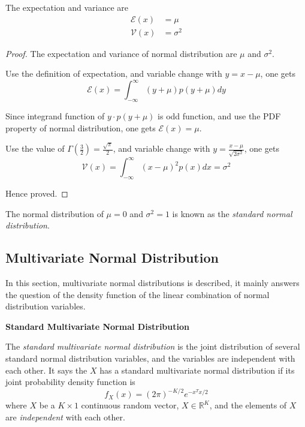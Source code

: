 The expectation and variance are
\begin{align*}
    \mathcal{E}(x) & = \mu      \\
    \mathcal{V}(x) & = \sigma^2
\end{align*}

\begin{proof}
    The expectation and variance of normal distribution are $\mu$ and $\sigma^2$.

    Use the definition of expectation, and variable change with $y = x - \mu$, one gets
    \begin{equation*}
        \mathcal{E}(x) = \int_{-\infty}^{\infty} (y+\mu) p(y+\mu) dy
    \end{equation*}

    Since integrand function of $y \cdot p(y+\mu)$ is odd function,
    and use the PDF property of normal distribution,
    one gets $\mathcal{E}(x) = \mu$.

    Use the value of $\Gamma(\frac{3}{2}) = \frac{\sqrt{\pi}}{2}$,
    and variable change with $y = \frac{x - \mu}{\sqrt{2 \sigma^2}}$,
    one gets
    \begin{equation*}
        \mathcal{V}(x) = \int_{-\infty}^{\infty}
        (x - \mu)^2 p(x) dx
        = \sigma^2
    \end{equation*}

    Hence proved.
\end{proof}

The normal distribution of $\mu = 0$ and $\sigma^2 = 1$ is known as the \emph{standard normal distribution}.

\subsection{Multivariate Normal Distribution}

In this section, multivariate normal distributions is described,
it mainly answers the question of the density function of the linear combination of normal distribution variables.

\textbf{Standard Multivariate Normal Distribution}

The \emph{standard multivariate normal distribution} is the joint distribution of several standard normal distribution variables,
and the variables are independent with each other.
It says the $X$ has a standard multivariate normal distribution if its joint probability density function is
\begin{equation}
    \label{Equation: Standard multivariate normal distribution}
    f_X(x) = (2 \pi)^{-K/2} e^{-x^T x / 2}
\end{equation}
where $X$ be a $K \times 1$ continuous random vector, $X \in \mathbb{R}^K$,
and the elements of $X$ are \emph{independent} with each other.

